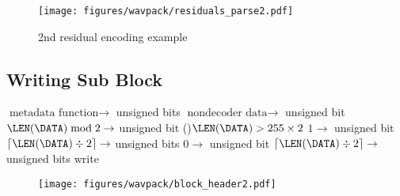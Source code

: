 {\begin{figure}[h]
  \texttt{[image: figures/wavpack/residuals\_parse2.pdf]}
  \caption{2nd residual encoding example}
\end{figure}

\clearpage

\subsection{Writing Sub Block}
{
$\text{metadata function} \rightarrow$  unsigned bits\;
$\text{nondecoder data} \rightarrow$  unsigned bit\;
$\LEN(\text{\DATA}) \bmod 2 \rightarrow$  unsigned bit
\eIf(){$\LEN(\text{\DATA}) > 255 \times 2$}{
  $1 \rightarrow$  unsigned bit\;
  $\lceil\LEN(\text{\DATA}) \div 2\rceil \rightarrow$  unsigned bits\;
}{
  $0 \rightarrow$  unsigned bit\;
  $\lceil\LEN(\text{\DATA}) \div 2\rceil \rightarrow$  unsigned bits\;
}
write \DATA\;
\EALGORITHM
}

\begin{figure}[h]
\texttt{[image: figures/wavpack/block\_header2.pdf]}
\end{figure}

\clearpage

}
